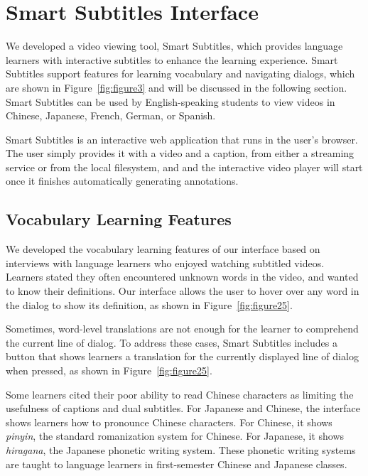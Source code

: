 \documentclass{sigchi}
\begin{document}
\section{Smart Subtitles Interface}

We developed a video viewing tool, Smart Subtitles, which provides language learners with interactive subtitles to enhance the learning experience. Smart Subtitles support features for learning vocabulary and navigating dialogs, which are shown in Figure~\ref{fig:figure3} and will be discussed in the following section. Smart Subtitles can be used by English-speaking students to view videos in Chinese, Japanese, French, German, or Spanish. %

Smart Subtitles is an interactive web application that runs in the user's browser. The user simply provides it with a video and a caption, from either a streaming service or from the local filesystem, and
and the interactive video player will start once it finishes automatically
generating annotations.

\subsection{Vocabulary Learning Features}

We developed the vocabulary learning features of our interface based
on interviews with language learners who enjoyed watching subtitled videos. Learners stated they often encountered
unknown words in the video, and wanted to know their definitions.
Our interface allows the user to hover over any word in
the dialog to show its definition, as shown in Figure~\ref{fig:figure25}.

Sometimes, word-level translations are not enough for the learner to comprehend the current line of dialog. To address these cases, Smart Subtitles includes a button that shows learners a translation for the currently displayed line of dialog when pressed, as shown in Figure~\ref{fig:figure25}.

Some learners cited their poor ability to
read Chinese characters
as limiting the usefulness of captions and dual subtitles.
For Japanese and Chinese, the interface shows learners how to pronounce
Chinese characters. For Chinese, it shows \emph{pinyin}, the standard romanization system for Chinese. For Japanese, it shows \emph{hiragana}, the Japanese phonetic writing system. These phonetic writing systems are taught to
language learners in first-semester Chinese and Japanese classes.
\end{document}
